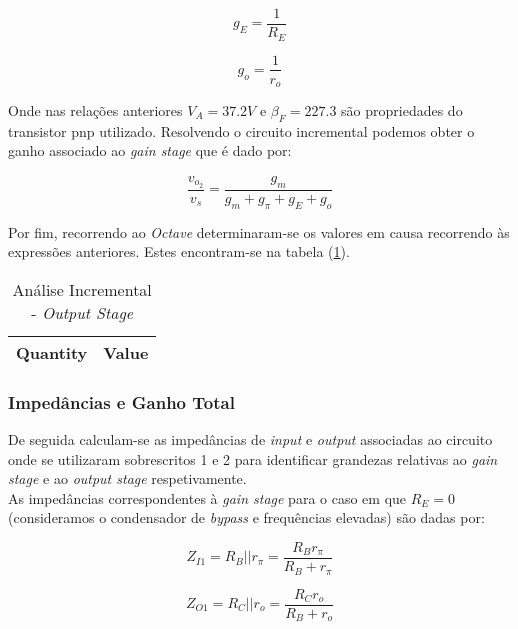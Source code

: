 \begin{equation}
  g_{E} = \frac{1}{R_{E}}
\end{equation}

\begin{equation}
  g_{o} = \frac{1}{r_{o}}
\end{equation}

Onde nas relações anteriores $V_A = 37.2 V$ e $\beta_F = 227.3$ são propriedades do transistor pnp utilizado.
Resolvendo o circuito incremental podemos obter o ganho associado ao \emph{gain stage} que é dado por:

\begin{equation}
  \frac{v_{o_2}}{v_{s}} = \frac{g_m}{g_m + g_{\pi} + g_E + g_o}
\end{equation}

Por fim, recorrendo ao \emph{Octave} determinaram-se os valores em causa recorrendo às expressões anteriores. Estes encontram-se na tabela (\ref{tab:AC-OutputStage}).

\begin{table}[H]
    \centering
    \begin{tabular}{|l|r|}
    \hline    
    {\bf Quantity} & {\bf Value} \\ \hline
    
    \end{tabular}
    \caption{Análise Incremental - \emph{Output Stage}}
    \label{tab:AC-OutputStage}
\end{table}

\subsubsection{Impedâncias e Ganho Total}

De seguida calculam-se as impedâncias de \emph{input} e \emph{output} associadas ao circuito onde se utilizaram sobrescritos 1 e 2
para identificar grandezas relativas ao \emph{gain stage} e ao \emph{output stage} respetivamente. \\
As impedâncias correspondentes à \emph{gain stage} para o caso em que $R_E = 0$ (consideramos o condensador de \emph{bypass} e
frequências elevadas) são dadas por:

\begin{equation}
  Z_{I1} = R_B || r_{\pi} = \frac{R_B r_{\pi}}{R_B + r_{\pi}}
\end{equation}

\begin{equation}
  Z_{O1} = R_C || r_{o} = \frac{R_C r_{o}}{R_B + r_{o}}
\end{equation}

